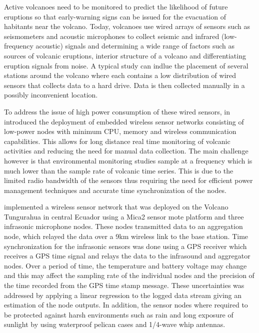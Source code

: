 Active volcanoes need to be monitored to predict the likelihood of future eruptions so that early-warning signs can be issued for the evacuation of habitants near the volcano. Today, volcanoes use wired arrays of sensors such as seismometers and acoustic microphones to collect seismic and infrared (low-frequency acoustic) signals and determining a wide range of factors such as sources of volcanic eruptions, interior structure of a volcano and differentiating eruption signals from noise. A typical study can indlue the placement of several stations around the volcano where each contains a low distribution of wired sensors that collects data to a hard drive. Data is then collected manually in a possibly inconvenient location.

To address the issue of high power consumption of these wired sensors, \citeauthor{Werner-Allen:2006:FYV:1298455.1298491} in \cite{Werner-Allen:2006:FYV:1298455.1298491} introduced the deployment of embedded wireless sensor networks consisting of low-power nodes with minimum CPU, memory and wireless communication capabilities. This allows for long distance real time monitoring of volcanic activities and reducing the need for manual data collection. The main challenge however is that environmental monitoring studies sample at a frequency which is much lower than the sample rate of volcanic time series. This is due to the limited radio bandwidth of the sensors thus requiring the need for efficient power management techniques and accurate time synchronization of the nodes. 

\citeauthor{Werner-Allen:2006:FYV:1298455.1298491} implemented a wireless sensor network that was deployed on the Volcano Tungurahua in central Ecuador using a Mica2 sensor mote platform and three infrasonic microphone nodes. These nodes transmitted data to an aggregation node, which relayed the data over a 9km wireless link to the base station. Time synchronization for the infrasonic sensors was done using a GPS receiver which receives a GPS time signal and relays the data 
to the infrasound and aggregator nodes. Over a period of time, the temperature and battery voltage may change and this may affect the sampling rate of the individual nodes and the precision of the time recorded from the GPS time stamp message. These uncertainties was addressed by applying a linear regression to the logged data stream giving an estimation of the node outputs. In addition, the sensor nodes where required to be protected against harsh environments such as rain and long exposure of sunlight by using waterproof pelican cases and 1/4-wave whip antennas.

